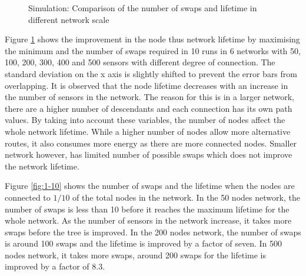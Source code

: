 \begin{figure}
\centering              
{}
\caption{Simulation: Comparison of the number of swaps and lifetime in different network scale}
\label{fig:maxmin}
\end{figure}

Figure \ref{fig:maxmin} shows the improvement in the node thus network lifetime by maximising the minimum and the number of swaps required in 10 runs in 6 networks with 50, 100, 200, 300, 400 and 500 sensors with different degree of connection. 
The standard deviation on the x axis is slightly shifted to prevent the error bars from overlapping.
It is observed that the node lifetime decreases with an increase in the number of sensors in the network. The reason for this is in a larger network, there are a higher number of descendants and each connection has its own path values. By taking into account these variables, the number of nodes affect the whole network lifetime. While a higher number of nodes allow more alternative routes, it also consumes more energy as there are more connected nodes. Smaller network however, has limited number of possible swaps which does not improve the network lifetime.

Figure \ref{fig:1-10} shows the number of swaps and the lifetime when the nodes are connected to $1/10$ of the total nodes in the network. 
In the 50 nodes network, the number of swaps is less than 10 before it reaches the maximum lifetime for the whole network. 
As the number of sensors in the network increase, it takes more swaps before the tree is improved. 
In the 200 nodes network, the number of swaps is around 100 swaps and the lifetime is improved by a factor of seven. In 500 nodes network, it takes more swaps, around 200 swaps for the lifetime is improved by a factor of 8.3. 

